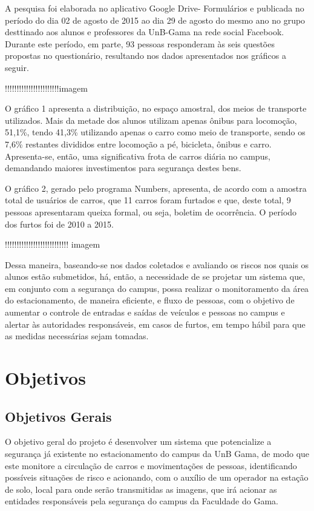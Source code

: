 A pesquisa foi elaborada no aplicativo Google Drive- Formulários  e publicada no período do dia 02 de agosto de 2015 ao dia 29 de agosto do mesmo ano no grupo desttinado aos alunos e professores da UnB-Gama na rede social Facebook. Durante este período, em parte, 93 pessoas responderam às seis questões propostas no questionário, resultando nos dados apresentados nos gráficos a seguir.

!!!!!!!!!!!!!!!!!!!!!!!imagem

O gráfico 1 apresenta a distribuição, no espaço amostral, dos meios  de transporte utilizados. Mais da metade dos alunos utilizam apenas ônibus para locomoção, 51,1\%, tendo 41,3\% utilizando apenas o carro como meio de transporte, sendo os 7,6\% restantes divididos entre locomoção a pé, bicicleta, ônibus e carro. Apresenta-se, então, uma significativa frota de carros diária no campus, demandando maiores investimentos para segurança destes bens.

O gráfico 2, gerado pelo programa Numbers, apresenta, de acordo com a amostra total de usuários de carros, que 11 carros foram furtados e que, deste total, 9 pessoas apresentaram queixa formal, ou seja, boletim de ocorrência. O período dos furtos foi de 2010 a 2015.

!!!!!!!!!!!!!!!!!!!!!!!!!!! imagem

Dessa maneira, baseando-se nos dados coletados e avaliando os riscos nos quais os alunos estão submetidos, há, então, a necessidade de se projetar  um sistema que, em conjunto com a segurança do campus, possa realizar o monitoramento  da área do estacionamento, de maneira eficiente, e fluxo de pessoas,  com o objetivo de aumentar o controle de entradas e saídas de veículos e pessoas no campus e alertar às autoridades responsáveis, em casos de furtos, em tempo hábil para que as medidas necessárias sejam tomadas.


\section{Objetivos} %
\label{sec:objetivos}

  \subsection{Objetivos Gerais} %
  \label{sub:objetivos_gerais}

  O objetivo geral do projeto é desenvolver um sistema que potencialize a segurança já existente no estacionamento do campus da UnB Gama, de modo que este monitore a circulação de carros e movimentações de pessoas, identificando possíveis situações de risco e acionando, com o auxílio de um operador na estação de solo, local para onde serão transmitidas as imagens, que irá acionar as entidades responsáveis pela segurança do campus da Faculdade do Gama.

